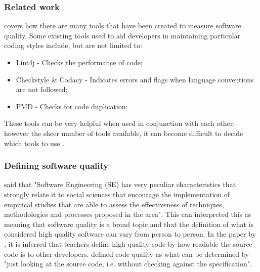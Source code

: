 \subsubsection{Related work}

\cite{8681007} covers how there are many tools that have been created to measure software quality. Some existing tools used to aid developers in maintaining particular coding styles include, but are not limited to:
\begin{itemize}
	\item Lint4j - Checks the performance of code;
	\item Checkstyle \& Codacy - Indicates errors and flags when language conventions are not followed;
	\item PMD - Checks for code duplication;
\end{itemize}
These tools can be very helpful when used in conjunction with each other, however the sheer number of tools available, it can become difficult to decide which tools to use \citep{6606742}.

\subsubsection{Defining software quality}
\cite{6606742} said that "Software Engineering (SE) has very peculiar characteristics that strongly relate it to social sciences that encourage the implementation of empirical studies that are able to assess the effectiveness of techniques, methodologies and processes proposed in the area". This can interpreted this as meaning that software quality is a broad topic and that the definition of what is considered high quality software can vary from person to person. In the paper by \cite{10.1145/3428029.3428047}, it is inferred that teachers define high quality code by how readable the source code is to other developers. \cite{10.1145/3428029.3428047, 10.1145/2674683.2674702} defined code quality as what can be determined by "just looking at the source code, i.e. without checking against the specification".
